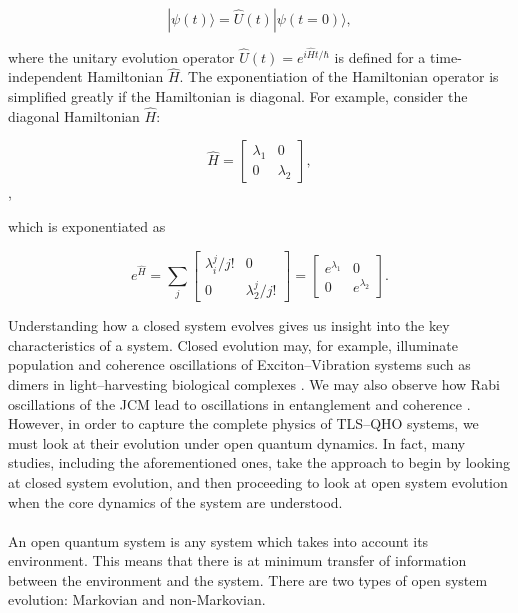\documentclass[12pt]{article}
\begin{document}
\begin{equation} \label{eqn:closed_evo}
    |\psi(t)\rangle = \hat{U}(t)|\psi(t=0)\rangle,
\end{equation}

where the unitary evolution operator $\hat{U}(t) = e^{i\hat{H}t/\hbar}$ is defined for a time-independent Hamiltonian $\hat{H}$. The exponentiation of the Hamiltonian operator is simplified greatly if the Hamiltonian is diagonal. For example, consider the diagonal Hamiltonian $\hat{H}$:

\begin{equation*}
    \hat{H} = 
    \begin{bmatrix}
        \lambda_1 & 0 \\
        0 & \lambda_2
    \end{bmatrix},
\end{equation*}, 

which is exponentiated as

\begin{equation*}
    e^{\hat{H}} = \sum_j 
    \begin{bmatrix}
        \lambda_i^j/j! & 0 \\
        0 & \lambda_2^j/j!
    \end{bmatrix}
    = \begin{bmatrix}
        e^{\lambda_1} & 0 \\
        0 & e^{\lambda_2}
    \end{bmatrix}.
\end{equation*}

Understanding how a closed system evolves gives us insight into the key characteristics of a system. Closed evolution may, for example, illuminate population and coherence oscillations of Exciton--Vibration systems such as dimers in light--harvesting biological complexes \cite{ExVib2014-Alexandra}. We may also observe how Rabi oscillations of the JCM lead to oscillations in entanglement and coherence \cite{Entanglement2009-REE_VNapplied}. However, in order to capture the complete physics of TLS--QHO systems, we must look at their evolution under open quantum dynamics. In fact, many studies, including the aforementioned ones, take the approach to begin by looking at closed system evolution, and then proceeding to look at open system evolution when the core dynamics of the system are understood.\\
\\
An open quantum system is any system which takes into account its environment. This means that there is at minimum transfer of information between the environment and the system. There are two types of open system evolution: Markovian and non-Markovian.
\end{document}
